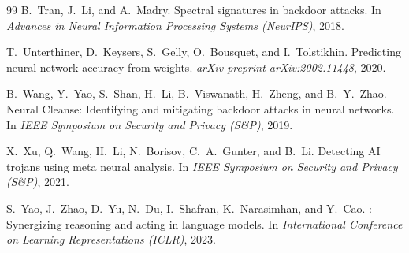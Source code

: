\documentclass[11pt]{article}
\begin{document}
\begin{thebibliography}{99}
B.~Tran, J.~Li, and A.~Madry.
\newblock Spectral signatures in backdoor attacks.
\newblock In \emph{Advances in Neural Information Processing Systems (NeurIPS)}, 2018.

T.~Unterthiner, D.~Keysers, S.~Gelly, O.~Bousquet, and I.~Tolstikhin.
\newblock Predicting neural network accuracy from weights.
\newblock \emph{arXiv preprint arXiv:2002.11448}, 2020.

B.~Wang, Y.~Yao, S.~Shan, H.~Li, B.~Viswanath, H.~Zheng, and B.~Y.~Zhao.
\newblock Neural Cleanse: Identifying and mitigating backdoor attacks in neural networks.
\newblock In \emph{IEEE Symposium on Security and Privacy (S\&P)}, 2019.

X.~Xu, Q.~Wang, H.~Li, N.~Borisov, C.~A.~Gunter, and B.~Li.
\newblock Detecting {AI} trojans using meta neural analysis.
\newblock In \emph{IEEE Symposium on Security and Privacy (S\&P)}, 2021.

S.~Yao, J.~Zhao, D.~Yu, N.~Du, I.~Shafran, K.~Narasimhan, and Y.~Cao.
: Synergizing reasoning and acting in language models.
\newblock In \emph{International Conference on Learning Representations (ICLR)}, 2023.
\end{thebibliography}
\end{document}
